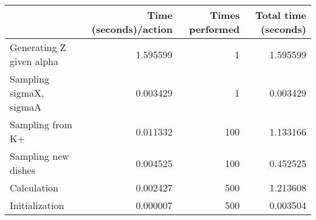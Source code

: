 \begin{tabular}{lrrr}
\toprule
{} &  Time (seconds)/action &  Times performed &  Total time (seconds) \\
\midrule
Generating Z given alpha &               1.595599 &                1 &              1.595599 \\
Sampling sigmaX, sigmaA  &               0.003429 &                1 &              0.003429 \\
Sampling from K+         &               0.011332 &              100 &              1.133166 \\
Sampling new dishes      &               0.004525 &              100 &              0.452525 \\
Calculation              &               0.002427 &              500 &              1.213608 \\
Initialization           &               0.000007 &              500 &              0.003504 \\
\bottomrule
\end{tabular}
